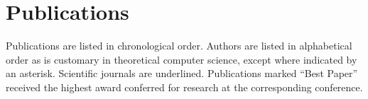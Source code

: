 
\newcommand{\mytab}{\hspace*{10mm}}
\newcommand{\cvpub}[3]{\item \fTitle{#1} \\ \fAuthor{#2} \\ \textit{#3}}
\newcommand{\cvpubinline}[3]{\item \fTitle{#1} \\ \fAuthor{#2}, #3}
\renewcommand{\cvpubinline}[3]{\cvpub{#1}{#2}{#3}}
\newcommand{\forthcoming}{\textnormal{(Forthcoming)}}
\newcommand{\submission}{\textnormal{(In Submission)}}
\newcommand{\distinguished}{\textnormal{(\textbf{Best Paper})}}
\newcommand{\invited}{\textbf{Invited}}
\newcommand{\fJournal}[1]{\uline{#1}}

\newif\ifnumberpubs
\numberpubstrue


\newif\ifmanuscripts
\manuscriptstrue





\section{Publications}
Publications are listed in chronological order. Authors are listed in alphabetical order as is customary in theoretical computer science, except where indicated by an asterisk. Scientific journals are underlined.
Publications marked ``Best Paper'' received the highest award conferred for research at the corresponding conference.

